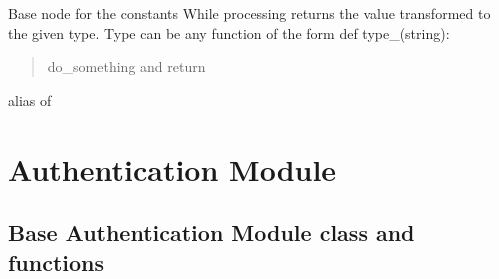 \documentclass[letterpaper,10pt,english]{sphinxmanual}
\begin{document}
\begin{fulllineitems}
\label{sysmod:pyfrid.modules.system.vm.leplvm.ValueNode}
Base node for the constants
While processing returns the value transformed to the given type.
Type can be any function of the form
def type\_(string):
\begin{quote}

do\_something
and return
\end{quote}

\begin{fulllineitems}
\label{sysmod:pyfrid.modules.system.vm.leplvm.ValueNode.type_}
alias of 

\end{fulllineitems}


\end{fulllineitems}



\section{Authentication Module}
\label{sysmod:authentication-module}

\subsection{Base Authentication Module class and functions}
\label{sysmod:base-authentication-module-class-and-functions}\label{sysmod:module-pyfrid.modules.system.auth.core.auth}
\end{document}
